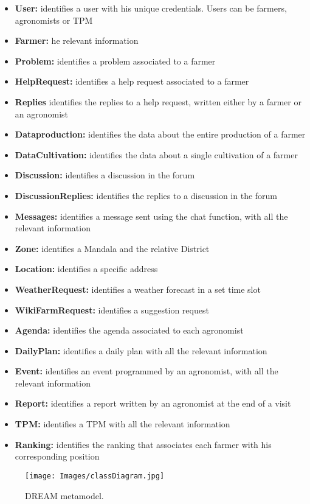 \begin{itemize}
    \item \textbf{User:} identifies a user with his unique credentials. Users can be farmers, agronomists or TPM
    \item \textbf{Farmer:} he relevant information
    \item \textbf{Problem:} identifies a problem associated to a farmer
    \item \textbf{HelpRequest:} identifies a help request associated to a farmer
    \item \textbf{Replies} identifies the replies to a help request, written either by a farmer or an agronomist
    \item \textbf{Dataproduction: } identifies the data about the entire production of a farmer
    \item \textbf{DataCultivation:} identifies the data about a single cultivation of a farmer
    \item \textbf{Discussion:} identifies a discussion in the forum
    \item \textbf{DiscussionReplies:} identifies the replies to a discussion in the forum
    \item \textbf{Messages:} identifies a message sent using the chat function, with all the relevant information
    \item \textbf{Zone:} identifies a Mandala and the relative District
    \item \textbf{Location:} identifies a specific address
    \item \textbf{WeatherRequest:} identifies a weather forecast in a set time slot
    \item \textbf{WikiFarmRequest:} identifies a suggestion request
    \item \textbf{Agenda:} identifies the agenda associated to each agronomist
    \item \textbf{DailyPlan:} identifies a daily plan with all the relevant information
    \item \textbf{Event:} identifies an event programmed by an agronomist, with all the relevant information
    \item \textbf{Report:} identifies a report written by an agronomist at the end of a visit
    \item \textbf{TPM:} identifies a TPM with all the relevant information
    \item \textbf{Ranking:} identifies the ranking that associates each farmer with his corresponding position
\end{itemize}
\newpage
\begin{figure}[H]
\centering
\texttt{[image: Images/classDiagram.jpg]}
\caption{\label{fig:metamodel}DREAM metamodel.}
\end{figure}

